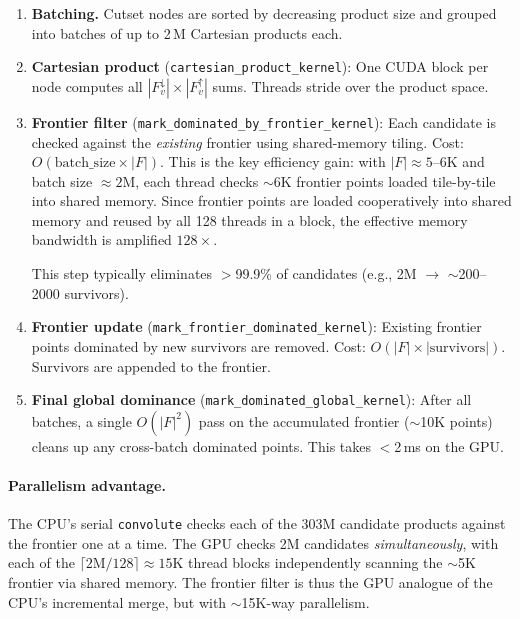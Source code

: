 \documentclass[11pt]{article}
\begin{document}
\begin{enumerate}
  \item \textbf{Batching.}
        Cutset nodes are sorted by decreasing product size and grouped
        into batches of up to 2\,M Cartesian products each.

  \item \textbf{Cartesian product} (\texttt{cartesian\_product\_kernel}):
        One CUDA block per node computes all $|F_v^{\downarrow}| \times
        |F_v^{\uparrow}|$ sums.  Threads stride over the product space.

  \item \textbf{Frontier filter}
        (\texttt{mark\_dominated\_by\_frontier\_kernel}):
        Each candidate is checked against the \emph{existing} frontier
        using shared-memory tiling.
        Cost: $O(\text{batch\_size} \times |F|)$.
        This is the key efficiency gain: with $|F| \approx 5$--$6$K and
        batch size $\approx 2$M, each thread checks $\sim$6K frontier
        points loaded tile-by-tile into shared memory.
        Since frontier points are loaded cooperatively into shared memory
        and reused by all 128 threads in a block, the effective memory
        bandwidth is amplified $128\times$.

        This step typically eliminates $>$99.9\% of candidates
        (e.g., 2M $\to$ $\sim$200--2000 survivors).

  \item \textbf{Frontier update}
        (\texttt{mark\_frontier\_dominated\_kernel}):
        Existing frontier points dominated by new survivors are removed.
        Cost: $O(|F| \times |\text{survivors}|)$.
        Survivors are appended to the frontier.

  \item \textbf{Final global dominance}
        (\texttt{mark\_dominated\_global\_kernel}):
        After all batches, a single $O(|F|^2)$ pass on the accumulated
        frontier ($\sim$10K points) cleans up any cross-batch dominated
        points.  This takes $<$2\,ms on the GPU.
\end{enumerate}

\paragraph{Parallelism advantage.}
The CPU's serial \texttt{convolute} checks each of the 303M candidate
products against the frontier one at a time.
The GPU checks 2M candidates \emph{simultaneously}, with each of the
$\lceil 2\text{M}/128 \rceil \approx 15$K thread blocks independently
scanning the $\sim$5K frontier via shared memory.
The frontier filter is thus the GPU analogue of the CPU's incremental
merge, but with $\sim$15K-way parallelism.
\end{document}
